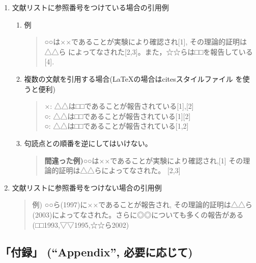 \documentclass[12pt, ]{jsarticle}
\begin{document}
\begin{enumerate}
  \begin{enumerate}
  \item
    文献リストに参照番号をつけている場合の引用例

    \begin{enumerate}
    \item
      例

      \begin{quote}
      ○○は××であることが実験により確認され{[}1{]}, その理論的証明は△△ら
      によってなされた{[}2,3{]}。また，☆☆らは□□を報告している{[}4{]}.
      \end{quote}
    \item
      複数の文献を引用する場合(LaTeXの場合はcitesスタイルファイル
      を使うと便利)

      \begin{quote}
      ×: △△は□□であることが報告されている{[}1{]},{[}2{]}\\
      ○: △△は□□であることが報告されている{[}1{]}{[}2{]}\\
      ○: △△は□□であることが報告されている{[}1,2{]}
      \end{quote}
    \item
      句読点との順番を逆にしてはいけない。

      \begin{quote}
      \textbf{間違った例)}○○は××であることが実験により確認され,{[}1{]}
      その理論的証明は△△らによってなされた。 {[}2,3{]}
      \end{quote}
    \end{enumerate}
  \item
    文献リストに参照番号をつけない場合の引用例

    \begin{quote}
    例) ○○ら(1997)に××であることが報告され, その理論的証明は△△ら
    (2003)によってなされた。さらに◎◎についても多くの報告がある
    (□□1993,▽▽1995,☆☆ら2002)
    \end{quote}
  \end{enumerate}
\end{enumerate}

\hypertarget{ux4ed8ux9332-appendix-ux5fc5ux8981ux306bux5fdcux3058ux3066}{%
\subsection{「付録」 (``Appendix'',
必要に応じて)}\label{ux4ed8ux9332-appendix-ux5fc5ux8981ux306bux5fdcux3058ux3066}}
\end{document}
